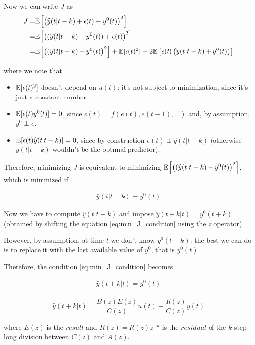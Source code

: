 Now we can write $J$ as 
\begin{align*}
	J =& \mathbb{E} \left[ \left( \widehat{y}(t|t-k) + \epsilon(t) - y^0(t) \right)^2 \right] \\
	  =& \mathbb{E} \left[ \left( (\widehat{y}(t|t-k) - y^0(t)) + \epsilon(t) \right)^2 \right] \\
	  =& \mathbb{E} \left[ \left( (\widehat{y}(t|t-k) - y^0(t) \right)^2 \right] + \mathbb{E} [\epsilon(t)^2 ] + 2 \mathbb{E} \left[ \epsilon(t) \left( \widehat{y}(t|t-k) + y^0(t) \right) \right] 
\end{align*}

where we note that

\begin{itemize}
	\item $\mathbb{E} [\epsilon(t)^2 ]$ doesn't depend on $u(t)$: it's not subject to minimization, since it's just a constant number.
	\item $\mathbb{E} [ \epsilon(t) y^0(t) ] = 0$, since $e(t) = f(e(t), e(t-1), \dots) $ and, by assumption, $y^0 \perp e$.
	\item $\mathbb{E} [ \epsilon(t) \widehat{y}(t|t-k) ] = 0$, since by construction $\epsilon(t) \perp \hat{y}(t|t-k)$ (otherwise $\hat{y}(t|t-k)$ wouldn't be the optimal predictor).
\end{itemize}

Therefore, minimizing $J$ is equivalent to minimizing  $\mathbb{E} \left[ \left( (\widehat{y}(t|t-k) - y^0(t) \right)^2 \right]$, which is minimized if

\begin{align}\label{eq:min_J_condition}
	\hat{y}(t|t-k) = y^0(t)
\end{align}

Now we have to compute $\hat{y}(t|t-k)$ and impose $\hat{y}(t+k|t) = y^0(t+k)$ (obtained by shifting the equation \ref{eq:min_J_condition} using the $z$ operator).

However, by assumption, at time $t$ we don't know $y^0(t+k)$: the best we can do is to replace it with the last available value of $y^0$, that is $y^0(t)$.

Therefore, the condition \ref{eq:min_J_condition} becomes 

\begin{align}\label{eq:new_min_J_condition}
	\hat{y}(t+k|t) = y^0(t)
\end{align}

\begin{recall}

	\[
		\hat{y}(t+k|t) = \frac{B(z) E(z)}{C(z)} u(t) + \frac{\tilde{R}(z)}{C(z)} y(t)
	\] 

	where $E(z)$ is the $result$ and $R(z) = \tilde{R}(z) z^{-k}$ is the $residual$ of the $k$-step long division between $C(z)$ and $A(z)$.

\end{recall}

